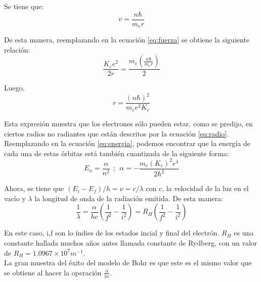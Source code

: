 \documentclass[%
 reprint,
 amsmath,amssymb,
 aps,
]{revtex4-1}
\begin{document}
Se tiene que:\\

\begin{equation}
	v=\frac{n\hbar}{m_e r}
\end{equation}

De esta manera, reemplazando en la ecuación \ref{eq:fuerza} se obtiene la siguiente relación:\\

\begin{equation}
	\frac{K_e e^2}{2r} = \frac{m_e (\frac{n\hbar}{m_e r})}{2}
\end{equation}

Luego,\\

\begin{equation}
	r=\frac{(n\hbar)^2}{m_e e^2 K_e}
\label{eq:radio}
\end{equation}

Esta expresión muestra que los electrones sólo pueden estar, como se predijo, en ciertos radios no radiantes que están descritos por la ecuación \ref{eq:radio}.\\

Reemplazando en la ecuación \ref{eq:energia}, podemos encontrar que la energía de cada una de estas órbitas está también cuantizada de la siguiente forma:\\

\begin{equation}
	E_n = \frac{\alpha}{n^2 }\ \ ;\ \ \alpha = -\frac{m_e (K_e)^2 e^4}{2\hbar^2}
\end{equation}

Ahora, se tiene que $ (E_i-E_f)/h = \nu = c/\lambda  $ con c, la velocidad de la luz en el vacío y $ \lambda $ la longitud de onda de la radiación emitida. De esta manera:\\

\begin{equation}
	\frac{1}{\lambda} = \frac{\alpha}{hc}\left(\frac{1}{f^2} - \frac{1}{i^2}\right) = R_H\left(\frac{1}{f^2} - \frac{1}{i^2}\right) 
\end{equation}

En este caso, i,f son lo índies de los estados incial y final del electrón. $ R_H $ es una constante hallada muchos años antes llamada constante de Rydberg, con un valor de $ R_H = 1.0967\times 10^7 m^{-1} $. \\

La gran muestra del éxito del modelo de Bohr es que este es el mismo valor que se obtiene al hacer la operación $ \frac{\alpha}{hc} $.\\
\end{document}
